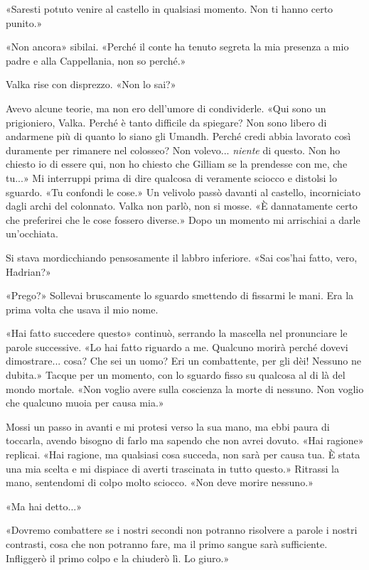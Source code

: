 «Saresti potuto venire al castello in qualsiasi momento. Non ti hanno
certo punito.»

«Non ancora» sibilai. «Perché il conte ha tenuto segreta la mia presenza
a mio padre e alla Cappellania, non so perché.»

Valka rise con disprezzo. «Non lo sai?»

Avevo alcune teorie, ma non ero dell'umore di condividerle. «Qui sono un
prigioniero, Valka. Perché è tanto difficile da spiegare? Non sono
libero di andarmene più di quanto lo siano gli Umandh. Perché credi
abbia lavorato così duramente per rimanere nel colosseo? Non volevo...
\emph{niente} di questo. Non ho chiesto io di essere qui, non ho chiesto
che Gilliam se la prendesse con me, che tu...» Mi interruppi prima di
dire qualcosa di veramente sciocco e distolsi lo sguardo. «Tu confondi
le cose.» Un velivolo passò davanti al castello, incorniciato dagli
archi del colonnato. Valka non parlò, non si mosse. «È dannatamente
certo che preferirei che le cose fossero diverse.» Dopo un momento mi
arrischiai a darle un'occhiata.

Si stava mordicchiando pensosamente il labbro inferiore. «Sai cos'hai
fatto, vero, Hadrian?»

«Prego?» Sollevai bruscamente lo sguardo smettendo di fissarmi le mani.
Era la prima volta che usava il mio nome.

«Hai fatto succedere questo» continuò, serrando la mascella nel
pronunciare le parole successive. «Lo hai fatto riguardo a me. Qualcuno
morirà perché dovevi dimostrare... cosa? Che sei un uomo? Eri un
combattente, per gli dèi! Nessuno ne dubita.» Tacque per un momento, con
lo sguardo fisso su qualcosa al di là del mondo mortale. «Non voglio
avere sulla coscienza la morte di nessuno. Non voglio che qualcuno muoia
per causa mia.»

Mossi un passo in avanti e mi protesi verso la sua mano, ma ebbi paura
di toccarla, avendo bisogno di farlo ma sapendo che non avrei dovuto.
«Hai ragione» replicai. «Hai ragione, ma qualsiasi cosa succeda, non
sarà per causa tua. È stata una mia scelta e mi dispiace di averti
trascinata in tutto questo.» Ritrassi la mano, sentendomi di colpo molto
sciocco. «Non deve morire nessuno.»

«Ma hai detto...»

«Dovremo combattere se i nostri secondi non potranno risolvere a parole
i nostri contrasti, cosa che non potranno fare, ma il primo sangue sarà
sufficiente. Infliggerò il primo colpo e la chiuderò lì. Lo giuro.»

